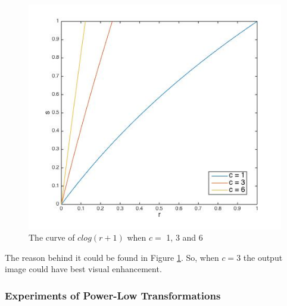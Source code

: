 \begin{figure}[h]
\centering
\includegraphics[scale=0.4]{log136}
\caption{The curve of $clog(r + 1)$ when $c =$ 1, 3 and 6}
\label{fig:curvelog}
\end{figure}
The reason behind it could be found in Figure \ref{fig:curvelog}. So, when $c=3$ the output image could have best visual enhancement.
\subsubsection{Experiments of Power-Low Transformations}






